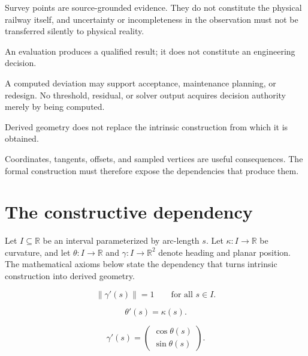 Survey points are source-grounded evidence. They do not constitute the
physical railway itself, and uncertainty or incompleteness in the
observation must not be transferred silently to physical reality.

\begin{axiom}
\label{ax:evaluation-decision-separation}
An evaluation produces a qualified result; it does not constitute an
engineering decision.
\end{axiom}

A computed deviation may support acceptance, maintenance planning, or
redesign. No threshold, residual, or solver output acquires decision
authority merely by being computed.

\begin{axiom}
\label{ax:intrinsic-derived-separation}
Derived geometry does not replace the intrinsic construction from which
it is obtained.
\end{axiom}

Coordinates, tangents, offsets, and sampled vertices are useful
consequences. The formal construction must therefore expose the
dependencies that produce them.

\section{The constructive dependency}

Let \(I\subseteq\mathbb{R}\) be an interval parameterized by arc-length
\(s\). Let \(\kappa:I\rightarrow\mathbb{R}\) be curvature, and let
\(\theta:I\rightarrow\mathbb{R}\) and
\(\gamma:I\rightarrow\mathbb{R}^{2}\) denote heading and planar
position. The mathematical axioms below state the dependency that turns
intrinsic construction into derived geometry.

\begin{axiom}
\label{ax:arc-length-parameterization}
\[
\lVert\gamma'(s)\rVert=1
\qquad\text{for all }s\in I.
\]
\end{axiom}

\begin{axiom}
\label{ax:heading-evolution}
\[
\theta'(s)=\kappa(s).
\]
\end{axiom}

\begin{axiom}
\label{ax:tangent-reconstruction}
\[
\gamma'(s)=
\begin{pmatrix}
\cos\theta(s)\\
\sin\theta(s)
\end{pmatrix}.
\]
\end{axiom}

